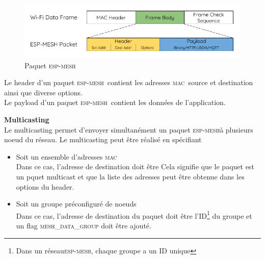 \documentclass[a4paper, 12pt]{report}
\newcommand{\espmesh}{\textsc{esp-mesh}}
\newcommand{\mac}{\textsc{mac}}
\begin{document}
            \begin{figure}[h]
                \centering
                \includegraphics[scale=0.5]{images/mesh-packet.png}
                \caption{Paquet \espmesh\ \cite{esp-mesh_w}}
                \label{fig_meshPacket}
            \end{figure}
            Le header d'un paquet \espmesh\ contient les adresses \mac\ source et destination ainsi que diverse options.\\
            Le payload d'un paquet \espmesh\ contient les données de l'application.
        
        \vspace{0.5cm}
        \textbf{Multicasting}\\
            Le multicasting permet d'envoyer simultanément un paquet \espmesh à plusieurs noeud du réseau. Le multicasting
            peut être réalisé en spécifiant
            \begin{itemize}
                \item Soit un ensemble d'adresses \mac\\
                    Dans ce cas, l'adresse de destination doit être
                    {\selectfont {}}
                    Cela signifie que le paquet est un pquet multicast et que la liste des adresses peut être obtenue dans les options du header.
                \item Soit un groupe préconfiguré de noeuds\\
                    Dans ce cas, l'adresse de destination du paquet doit être l'ID\footnote{Dans un réseau\espmesh, chaque groupe a un ID unique}
                    du groupe et un flag \textsc{mesh\_data\_group} doit être ajouté.
            \end{itemize}
\end{document}
